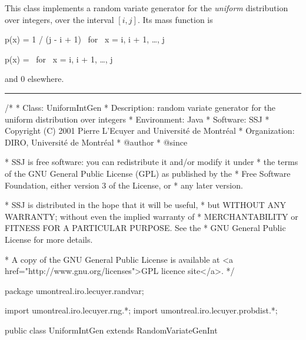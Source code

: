 
This class implements a random variate generator for the 
{\em uniform\/} distribution over integers, over the interval $[i,j]$.
Its mass function is
\begin{htmlonly}
\eq
   p(x) = 1 / (j - i + 1)  \qquad\mbox{ for } x = i, i + 1, \ldots, j
\endeq
\end{htmlonly}%
\begin{latexonly}
\eq
   p(x) =   \qquad\mbox{ for } x = i, i + 1, \ldots, j
\endeq
\end{latexonly}
and 0 elsewhere.

\bigskip\hrule

\begin{code}
\begin{hide}
/*
 * Class:        UniformIntGen
 * Description:  random variate generator for the uniform distribution over integers
 * Environment:  Java
 * Software:     SSJ 
 * Copyright (C) 2001  Pierre L'Ecuyer and Université de Montréal
 * Organization: DIRO, Université de Montréal
 * @author       
 * @since

 * SSJ is free software: you can redistribute it and/or modify it under
 * the terms of the GNU General Public License (GPL) as published by the
 * Free Software Foundation, either version 3 of the License, or
 * any later version.

 * SSJ is distributed in the hope that it will be useful,
 * but WITHOUT ANY WARRANTY; without even the implied warranty of
 * MERCHANTABILITY or FITNESS FOR A PARTICULAR PURPOSE.  See the
 * GNU General Public License for more details.

 * A copy of the GNU General Public License is available at
   <a href="http://www.gnu.org/licenses">GPL licence site</a>.
 */
\end{hide}
package umontreal.iro.lecuyer.randvar;\begin{hide}
import umontreal.iro.lecuyer.rng.*;
import umontreal.iro.lecuyer.probdist.*;
\end{hide}

public class UniformIntGen extends RandomVariateGenInt \begin{hide} {
   protected int left;     // the left limit of the interval
   protected int right;    // the right limit of the interval
    
\end{hide}
\end{code}

